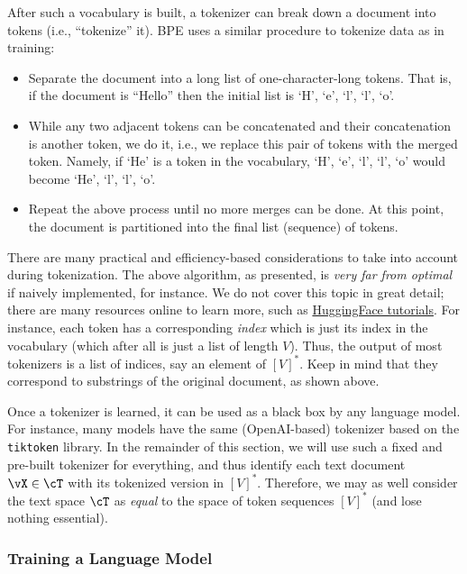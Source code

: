 \documentclass[../../book-main.tex]{subfiles}
\begin{document}
After such a vocabulary is built, a tokenizer can break down a
document into tokens (i.e., ``tokenize'' it). BPE uses a similar
procedure to tokenize data as in training:
\begin{itemize}
\item Separate the document into a long list of one-character-long
    tokens. That is, if the document is ``Hello'' then the initial
    list is `H', `e', `l', `l', `o'.
\item While any two adjacent tokens can be concatenated and their
    concatenation is another token, we do it, i.e., we replace this
    pair of tokens with the merged token. Namely, if `He' is a token
    in the vocabulary, `H', `e', `l', `l', `o' would become `He', `l', `l', `o'.
\item Repeat the above process until no more merges can be done. At
    this point, the document is partitioned into the final list
    (sequence) of tokens.
\end{itemize}

There are many practical and efficiency-based considerations to take
into account during tokenization. The above algorithm, as presented,
is \textit{very far from optimal} if naively implemented, for
instance. We do not cover this topic in great detail; there are many
resources online to learn more, such as
\href{https://huggingface.co/learn/nlp-course/en/chapter6/5}{HuggingFace
tutorials}. For instance, each token has a corresponding \textit{index} which is
just its index in the vocabulary (which after all is just a list of
length \(V\)). Thus, the output of most tokenizers is a list of
indices, say an element of \([V]^{*}\). Keep in mind that they
correspond to substrings of the original document, as shown above.

Once a tokenizer is learned, it can be used as a black box by any
language model. For instance, many models have the same
(OpenAI-based) tokenizer based on the \texttt{tiktoken} library. In
the remainder of this section, we will use such a fixed and pre-built
tokenizer for everything, and thus identify each text document \(\vX
\in \cT\) with its tokenized version in \([V]^{*}\). Therefore, we
may as well consider the text space \(\cT\) as \textit{equal} to the
space of token sequences \([V]^{*}\) (and lose nothing essential).

\subsubsection{Training a Language Model}
\end{document}
